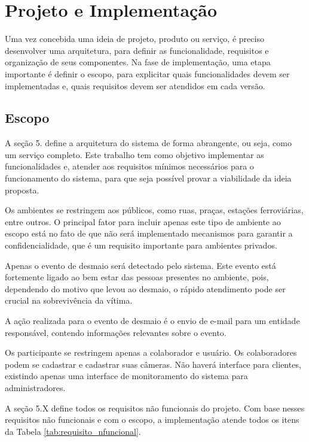 \documentclass[]{politex}
\begin{document}
\chapter{Projeto e Implementação}
Uma vez concebida uma ideia de projeto, produto ou serviço, é preciso desenvolver uma arquitetura, para definir as funcionalidade, requisitos e organização de seus componentes. Na fase de implementação, uma etapa importante é definir o escopo, para explicitar quais funcionalidades devem ser implementadas e, quais requisitos devem ser atendidos em cada versão.

\section{Escopo}
A seção 5. define a arquitetura do sistema de forma abrangente, ou seja, como um serviço completo. Este trabalho tem como objetivo implementar as funcionalidades e, atender aos requisitos mínimos necessários para o funcionamento do sistema, para que seja possível provar a viabilidade da ideia proposta.

Os ambientes se restringem aos públicos, como ruas, praças, estações ferroviárias, entre outros. O principal fator para incluir apenas este tipo de ambiente ao escopo está no fato de que não será implementado mecanismos para garantir a confidencialidade, que é um requisito importante para ambientes privados.

Apenas o evento de desmaio será detectado pelo sistema. Este evento está fortemente ligado ao bem estar das pessoas presentes no ambiente, pois, dependendo do motivo que levou ao desmaio, o rápido atendimento pode ser crucial na sobrevivência da vítima.

A ação realizada para o evento de desmaio é o envio de e-mail para um entidade responsável, contendo informações relevantes sobre o evento.

Os participante se restringem apenas a colaborador e usuário. Os colaboradores podem se cadastrar e cadastrar suas câmeras. Não haverá interface para clientes, existindo apenas uma interface de monitoramento do sistema para administradores.

A seção 5.X define todos os requisitos não funcionais do projeto. Com base nesses requisitos não funcionais e com o escopo, a implementação atende todos os itens da Tabela \ref{tab:requisito_nfuncional}.
\end{document}
